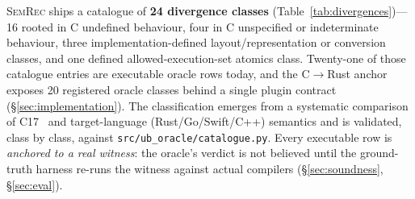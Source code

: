 \documentclass[10pt,a4paper]{article}
\begin{document}
\textsc{SemRec} ships a catalogue of \textbf{24 divergence classes}
(Table~\ref{tab:divergences})---16 rooted in C undefined behaviour, four in C
unspecified or indeterminate behaviour, three implementation-defined layout/representation
or conversion classes, and one defined allowed-execution-set atomics class.
Twenty-one of those catalogue entries are executable oracle rows today, and the
C$\to$Rust anchor exposes 20 registered oracle
classes behind a single plugin contract (\S\ref{sec:implementation}).  The
classification emerges from a systematic comparison of C17~\cite{iso9899} and
target-language (Rust/Go/Swift/C++) semantics and is validated, class by class,
against \texttt{src/ub\_oracle/catalogue.py}. Every executable row is
\emph{anchored to a real witness}: the oracle's verdict is not believed until the
ground-truth harness re-runs the witness against actual compilers
(\S\ref{sec:soundness}, \S\ref{sec:eval}).
\end{document}
